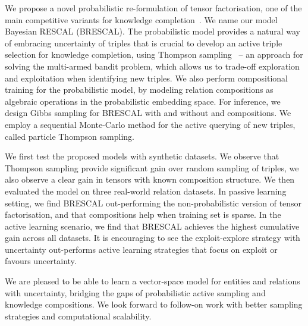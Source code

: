 We propose a novel probabilistic re-formulation of tensor factorisation,  
one of the main competitive variants for knowledge completion~\cite{nickel2015review}. 
We name our model Bayesian RESCAL (BRESCAL).
The probabilistic model provides a natural way of 
embracing uncertainty of triples that is crucial to develop 
an active triple selection for knowledge completion, using 
Thompson sampling~\cite{scott10bandit} -- an approach for solving the multi-armed bandit problem,
which allows us to trade-off exploration and exploitation when identifying new triples.
We also perform compositional training for the probabilistic model, 
by modeling relation compositions as algebraic operations in the probabilistic embedding space. 
For inference, we design Gibbs sampling for BRESCAL with and without and compositions. 
We employ a sequential Monte-Carlo method for the active querying of new triples, 
called particle Thompson sampling. 

We first test the proposed models with synthetic datasets. 
We observe that Thompson sampling provide significant gain over random sampling of triples, 
we also observe a clear gain in tensors with known composition structure. 
We then evaluated the model on three real-world relation datasets. In passive learning setting, 
we find BRESCAL out-performing the non-probabilistic version of tensor factorisation, 
and that compositions help when training set is sparse. 
In the active learning scenario, 
we find that BRESCAL achieves the highest cumulative gain across all datasets. 
It is encouraging to see the exploit-explore strategy with uncertainty out-performs 
active learning strategies that focus on exploit or favours uncertainty. 

We are pleased to be able to learn a vector-space model for entities and relations with uncertainty, 
bridging the gaps of probabilistic active sampling and knowledge compositions. 
We look forward to follow-on work with better sampling strategies and computational scalability. 

